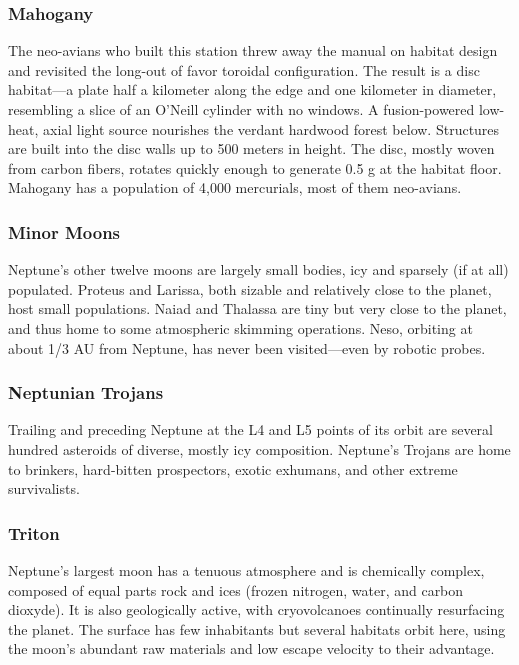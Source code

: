 \subsubsection{Mahogany}

The neo-avians who built this station threw away 
the manual on habitat design and revisited the long-out
of favor toroidal configuration. The result is a
disc habitat—a plate half a kilometer along the edge 
and one kilometer in diameter, resembling a slice 
of an O'Neill cylinder with no windows. A fusion-powered
low-heat, axial light source nourishes
the verdant hardwood forest below. Structures are 
built into the disc walls up to 500 meters in height. 
The disc, mostly woven from carbon fibers, rotates 
quickly enough to generate 0.5 g at the habitat floor. 
Mahogany has a population of 4,000 mercurials, 
most of them neo-avians.

\subsubsection{Minor Moons}

Neptune's other twelve moons are largely small 
bodies, icy and sparsely (if at all) populated. Proteus 
and Larissa, both sizable and relatively close to the 
planet, host small populations. Naiad and Thalassa 
are tiny but very close to the planet, and thus home to 
some atmospheric skimming operations. Neso, orbiting
at about 1/3 AU from Neptune, has never been
visited—even by robotic probes.

\subsubsection{Neptunian Trojans}

Trailing and preceding Neptune at the L4 and L5 
points of its orbit are several hundred asteroids of 
diverse, mostly icy composition. Neptune's Trojans 
are home to brinkers, hard-bitten prospectors, exotic 
exhumans, and other extreme survivalists.

\subsubsection{Triton}

Neptune's largest moon has a tenuous atmosphere and 
is chemically complex, composed of equal parts rock 
and ices (frozen nitrogen, water, and carbon dioxyde). 
It is also geologically active, with cryovolcanoes continually
resurfacing the planet. The surface has few
inhabitants but several habitats orbit here, using the 
moon's abundant raw materials and low escape velocity
to their advantage.

